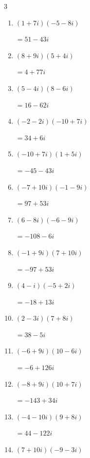 \begin{multicols}{3}
\begin{enumerate}
  \item $\displaystyle (1+7i)(-5-8i)$

        $\displaystyle =51-43i$

  \item $\displaystyle (8+9i)(5+4i)$

        $\displaystyle =4+77i$

  \item $\displaystyle (5-4i)(8-6i)$

        $\displaystyle =16-62i$

  \item $\displaystyle (-2-2i)(-10+7i)$

        $\displaystyle =34+6i$

  \item $\displaystyle (-10+7i)(1+5i)$

        $\displaystyle =-45-43i$

  \item $\displaystyle (-7+10i)(-1-9i)$

        $\displaystyle =97+53i$

  \item $\displaystyle (6-8i)(-6-9i)$

        $\displaystyle =-108-6i$

  \item $\displaystyle (-1+9i)(7+10i)$

        $\displaystyle =-97+53i$

  \item $\displaystyle (4-i)(-5+2i)$

        $\displaystyle =-18+13i$

  \item $\displaystyle (2-3i)(7+8i)$

        $\displaystyle =38-5i$

  \item $\displaystyle (-6+9i)(10-6i)$

        $\displaystyle =-6+126i$

  \item $\displaystyle (-8+9i)(10+7i)$

        $\displaystyle =-143+34i$

  \item $\displaystyle (-4-10i)(9+8i)$

        $\displaystyle =44-122i$

  \item $\displaystyle (7+10i)(-9-3i)$


\end{enumerate}
\end{multicols}
